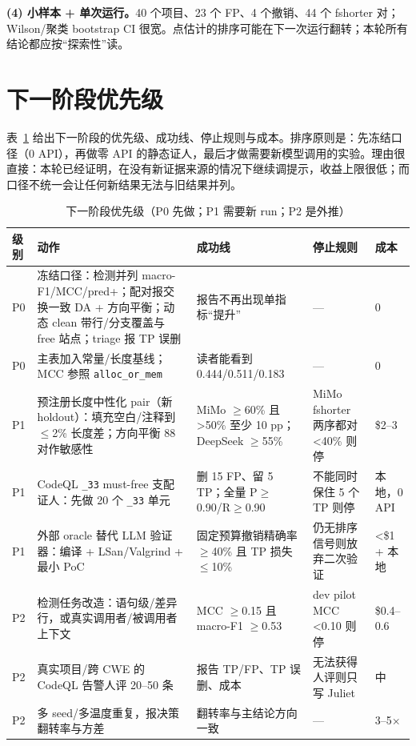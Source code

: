 \documentclass[conference]{IEEEtran}
\begin{document}
\textbf{(4) 小样本 + 单次运行。}40 个项目、23 个 FP、4 个撤销、44 个 fshorter 对；Wilson/聚类 bootstrap CI 很宽。点估计的排序可能在下一次运行翻转；本轮所有结论都应按“探索性”读。

\section{下一阶段优先级}
\label{sec:priority}

表~\ref{tab:priority} 给出下一阶段的优先级、成功线、停止规则与成本。排序原则是：先冻结口径（0 API），再做零 API 的静态证人，最后才做需要新模型调用的实验。理由很直接：本轮已经证明，在没有新证据来源的情况下继续调提示，收益上限很低；而口径不统一会让任何新结果无法与旧结果并列。

\begin{table}[t]
\centering
\caption{下一阶段优先级（P0 先做；P1 需要新 run；P2 是外推）}
\label{tab:priority}
\footnotesize
\setlength{\tabcolsep}{4pt}
\begin{tabular}{@{}p{0.8cm}p{4.6cm}p{4.8cm}p{3.8cm}p{1.9cm}@{}}
\toprule
级别 & 动作 & 成功线 & 停止规则 & 成本 \\
\midrule
P0 & 冻结口径：检测并列 macro-F1/MCC/pred+；配对报交换一致 DA + 方向平衡；动态 clean 带行/分支覆盖与 free 站点；triage 报 TP 误删 & 报告不再出现单指标“提升” & --- & 0 \\
P0 & 主表加入常量/长度基线；MCC 参照 \texttt{alloc\_or\_mem} & 读者能看到 0.444/0.511/0.183 & --- & 0 \\
P1 & 预注册长度中性化 pair（新 holdout）：填充空白/注释到 $\le$2\% 长度差；方向平衡 88 对作敏感性 & MiMo $\ge$60\% 且 >50\% 至少 10 pp；DeepSeek $\ge$55\% & MiMo fshorter 两序都对 <40\% 则停 & \$2--3 \\
P1 & CodeQL \texttt{\_33} must-free 支配证人：先做 20 个 \texttt{\_33} 单元 & 删 15 FP、留 5 TP；全量 P$\ge$0.90/R$\ge$0.90 & 不能同时保住 5 个 TP 则停 & 本地，0 API \\
P1 & 外部 oracle 替代 LLM 验证器：编译 + LSan/Valgrind + 最小 PoC & 固定预算撤销精确率 $\ge$40\% 且 TP 损失 $\le$10\% & 仍无排序信号则放弃二次验证 & <\$1 + 本地 \\
P2 & 检测任务改造：语句级/差异行，或真实调用者/被调用者上下文 & MCC $\ge$0.15 且 macro-F1 $\ge$0.53 & dev pilot MCC <0.10 则停 & \$0.4--0.6 \\
P2 & 真实项目/跨 CWE 的 CodeQL 告警人评 20--50 条 & 报告 TP/FP、TP 误删、成本 & 无法获得人评则只写 Juliet & 中 \\
P2 & 多 seed/多温度重复，报决策翻转率与方差 & 翻转率与主结论方向一致 & --- & 3--5$\times$ \\
\bottomrule
\end{tabular}
\end{table}
\end{document}
